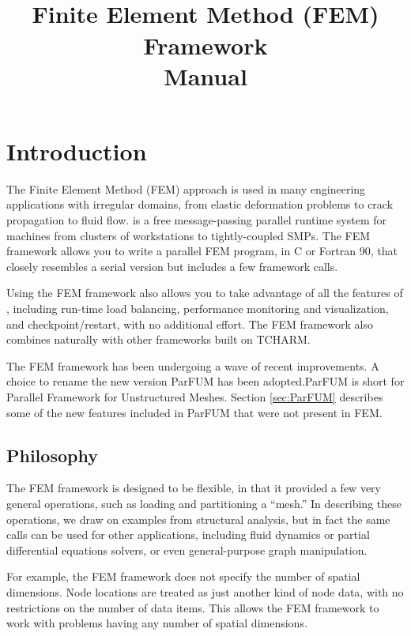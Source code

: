 \documentclass[10pt]{article}
\title{\charmpp\\ Finite Element Method (FEM) Framework\\ Manual}
\begin{document}
\maketitle

\section{Introduction}

The Finite Element Method (FEM) approach is used in many engineering
applications with irregular domains, from elastic deformation problems to
crack propagation to fluid flow.  \charmpp{} is a free message-passing parallel
runtime system for machines from clusters of workstations to tightly-coupled
SMPs.  The \charmpp{} FEM framework allows you to write a parallel FEM program,
in C or Fortran 90, that closely resembles a serial version but includes
a few framework calls.

Using the FEM framework also allows you to take advantage of all the
features of \charmpp, including run-time load balancing,  performance
monitoring and visualization, and checkpoint/restart, with no additional
effort. The FEM framework also combines naturally with other \charmpp
frameworks built on TCHARM.

The FEM framework has been undergoing a wave of recent improvements. A choice to rename the new version ParFUM has been adopted.ParFUM is short for Parallel Framework for Unstructured Meshes. Section \ref{sec:ParFUM} describes some of the new features included in ParFUM that were not present in FEM.


\subsection{Philosophy}

The \charmpp{} FEM framework is designed to be flexible, in that it
provided a few very general operations, such as loading and partitioning 
a ``mesh.''  
In describing these operations, we draw on examples from structural analysis,
but in fact the same calls can be used for other applications, including
fluid dynamics or partial differential equations solvers, or
even general-purpose graph manipulation.

For example, the FEM framework does not specify the number of spatial
dimensions.  Node locations are treated as just another kind of node data,
with no restrictions on the number of data items.
This allows the FEM framework to work with problems having any number 
of spatial dimensions.
\end{document}

